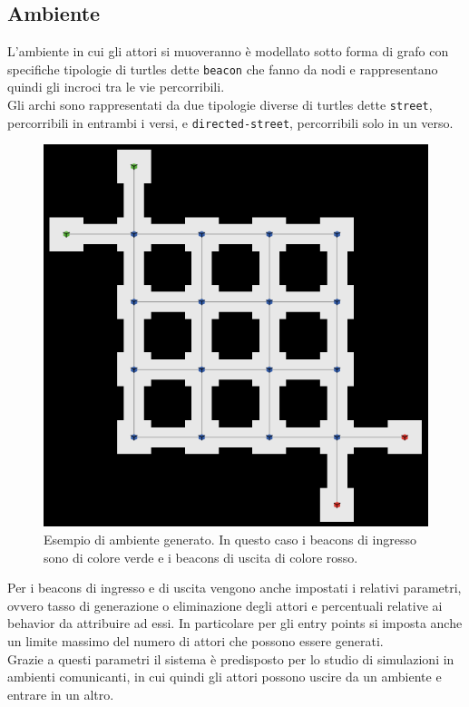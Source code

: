 \subsection{Ambiente}
L'ambiente in cui gli attori si muoveranno è modellato sotto forma di grafo con specifiche tipologie di turtles dette \texttt{beacon} che fanno da nodi e rappresentano quindi gli incroci tra le vie percorribili.\\
Gli archi sono rappresentati da due tipologie diverse di turtles dette \texttt{street}, percorribili in entrambi i versi, e \texttt{directed-street}, percorribili solo in un verso.\\
\begin{figure}[htbp]
\centering
\includegraphics[width=\textwidth,height=\textheight,keepaspectratio]{images/ambiente-screen.png}
\caption{Esempio di ambiente generato. In questo caso i beacons di ingresso sono di colore verde e i beacons di uscita di colore rosso.}
\label{fig:ambiente-screen}
\end{figure}
Per i beacons di ingresso e di uscita vengono anche impostati i relativi parametri, ovvero tasso di generazione o eliminazione degli attori e percentuali relative ai behavior da attribuire ad essi. In particolare per gli entry points si imposta anche un limite massimo del numero di attori che possono essere generati.\\
Grazie a questi parametri il sistema è predisposto per lo studio di simulazioni in ambienti comunicanti, in cui quindi gli attori possono uscire da un ambiente e entrare in un altro. 
